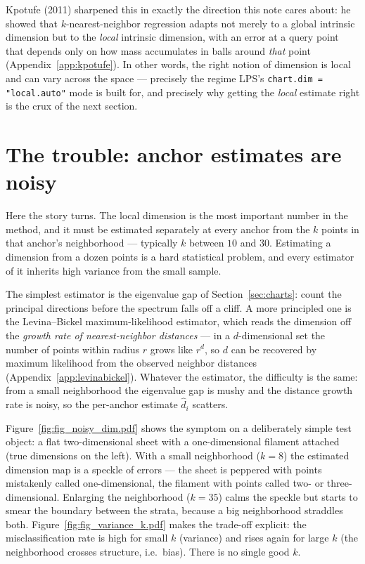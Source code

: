 \documentclass[11pt]{article}
\theoremstyle{definition}
\theoremstyle{remark}
\begin{document}
\begin{history}
Kpotufe (2011) sharpened this in exactly the direction this note cares about: he
showed that $k$-nearest-neighbor regression adapts not merely to a global
intrinsic dimension but to the \emph{local} intrinsic dimension, with an error at
a query point that depends only on how mass accumulates in balls around
\emph{that} point (Appendix~\ref{app:kpotufe}). In other words, the right notion
of dimension is local and can vary across the space --- precisely the regime LPS's
\texttt{chart.dim = "local.auto"} mode is built for, and precisely why getting the
\emph{local} estimate right is the crux of the next section.
\end{history}

\section{The trouble: anchor estimates are noisy}\label{sec:noise}

Here the story turns. The local dimension is the most important number in the
method, and it must be estimated separately at every anchor from the $k$ points in
that anchor's neighborhood --- typically $k$ between $10$ and $30$. Estimating a
dimension from a dozen points is a hard statistical problem, and every estimator
of it inherits high variance from the small sample.

The simplest estimator is the eigenvalue gap of Section~\ref{sec:charts}: count
the principal directions before the spectrum falls off a cliff. A more principled
one is the Levina--Bickel maximum-likelihood estimator, which reads the dimension
off the \emph{growth rate of nearest-neighbor distances} --- in a $d$-dimensional
set the number of points within radius $r$ grows like $r^d$, so $d$ can be
recovered by maximum likelihood from the observed neighbor distances
(Appendix~\ref{app:levinabickel}). Whatever the estimator, the difficulty is the
same: from a small neighborhood the eigenvalue gap is mushy and the distance
growth rate is noisy, so the per-anchor estimate $\widehat d_i$ scatters.

Figure~\ref{fig:fig_noisy_dim.pdf} shows the symptom on a deliberately simple test
object: a flat two-dimensional sheet with a one-dimensional filament attached
(true dimensions on the left). With a small neighborhood ($k=8$) the estimated
dimension map is a speckle of errors --- the sheet is peppered with points
mistakenly called one-dimensional, the filament with points called two- or
three-dimensional. Enlarging the neighborhood ($k=35$) calms the speckle but
starts to smear the boundary between the strata, because a big neighborhood
straddles both. Figure~\ref{fig:fig_variance_k.pdf} makes the trade-off explicit:
the misclassification rate is high for small $k$ (variance) and rises again for
large $k$ (the neighborhood crosses structure, i.e.\ bias). There is no single
good $k$.
\end{document}
